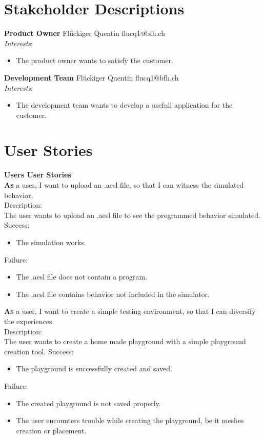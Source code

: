 \documentclass{scrreprt}
\begin{document}
\section{Stakeholder Descriptions}
\textbf{Product Owner}
Flückiger Quentin flucq1@bfh.ch \\
\textit{Interests}:
\begin{itemize}
  \item The product owner wants to satisfy the customer.
\end{itemize}


\textbf{Development Team}
Flückiger Quentin flucq1@bfh.ch \\
\textit{Interests}:
\begin{itemize}
  \item The development team wants to develop a usefull application for the customer.
\end{itemize}

\section{User Stories}
\textbf{\large Users User Stories}\\
\textbf{As} a user, I want to upload an .aesl file, so that I can witness the simulated behavior. \\
Description:\\
The user wants to upload an .aesl file to see the programmed behavior simulated.
Success:\\
\begin{itemize}
  \item The simulation works.
\end{itemize}
Failure:\\
\begin{itemize}
  \item The .aesl file does not contain a program.
  \item The .aesl file contains behavior not included in the simulator.
\end{itemize}


\textbf{As} a user, I want to create a simple testing environment, so that I can diversify the experiences. \\
Description:\\
The user wants to create a home made playground with a simple playground creation tool.
Success:\\
\begin{itemize}
  \item The playground is successfully created and saved.
\end{itemize}
Failure:\\
\begin{itemize}
  \item The created playground is not saved properly.
  \item The user encounters trouble while creating the playground, be it meshes creation or placement.
\end{itemize}
\end{document}
